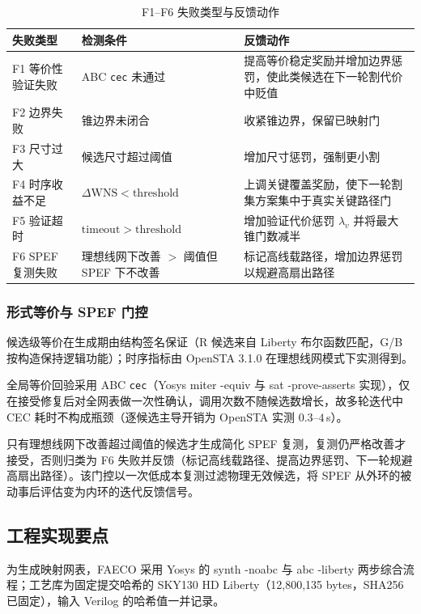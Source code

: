 \documentclass[journal]{IEEEtran}
\begin{document}
\begin{table}[!t]
\centering
\caption{F1--F6 失败类型与反馈动作}
\label{tab:failures}
\scriptsize
\setlength{\tabcolsep}{2pt}
\begin{tabular}{p{2.0cm}p{3.2cm}p{2.9cm}}
\toprule
\textbf{失败类型} & \textbf{检测条件} & \textbf{反馈动作} \\
\midrule
F1 等价性验证失败 & ABC \texttt{cec} 未通过 & 提高等价稳定奖励并增加边界惩罚，使此类候选在下一轮割代价中贬值 \\
F2 边界失败 & 锥边界未闭合 & 收紧锥边界，保留已映射门 \\
F3 尺寸过大 & 候选尺寸超过阈值 & 增加尺寸惩罚，强制更小割 \\
F4 时序收益不足 & $\Delta\mathrm{WNS} < \mathrm{threshold}$ & 上调关键覆盖奖励，使下一轮割集方案集中于真实关键路径门 \\
F5 验证超时 & $\mathrm{timeout} > \mathrm{threshold}$ & 增加验证代价惩罚 $\lambda_v$ 并将最大锥门数减半 \\
F6 SPEF 复测失败 & 理想线网下改善 $>$ 阈值但 SPEF 下不改善 & 标记高线载路径，增加边界惩罚以规避高扇出路径 \\
\bottomrule
\end{tabular}
\end{table}

\subsubsection{形式等价与 SPEF 门控}
候选级等价在生成期由结构签名保证（R 候选来自 Liberty 布尔函数匹配，G/B 按构造保持逻辑功能）；时序指标由 OpenSTA 3.1.0 在理想线网模式下实测得到。

全局等价回验采用 ABC \texttt{cec}（Yosys miter -equiv 与 sat -prove-asserts 实现），仅在接受修复后对全网表做一次性确认，调用次数不随候选数增长，故多轮迭代中 CEC 耗时不构成瓶颈（逐候选主导开销为 OpenSTA 实测 $0.3$--$4\,$s）。

只有理想线网下改善超过阈值的候选才生成简化 SPEF 复测，复测仍严格改善才接受，否则归类为 F6 失败并反馈（标记高线载路径、提高边界惩罚、下一轮规避高扇出路径）。该门控以一次低成本复测过滤物理无效候选，将 SPEF 从外环的被动事后评估变为内环的迭代反馈信号。

\subsection{工程实现要点}\label{sec:impl}

为生成映射网表，FAECO 采用 Yosys 的 synth -noabc 与 abc -liberty 两步综合流程；工艺库为固定提交哈希的 SKY130 HD Liberty（12,800,135 bytes，SHA256 已固定），输入 Verilog 的哈希值一并记录。
\end{document}
